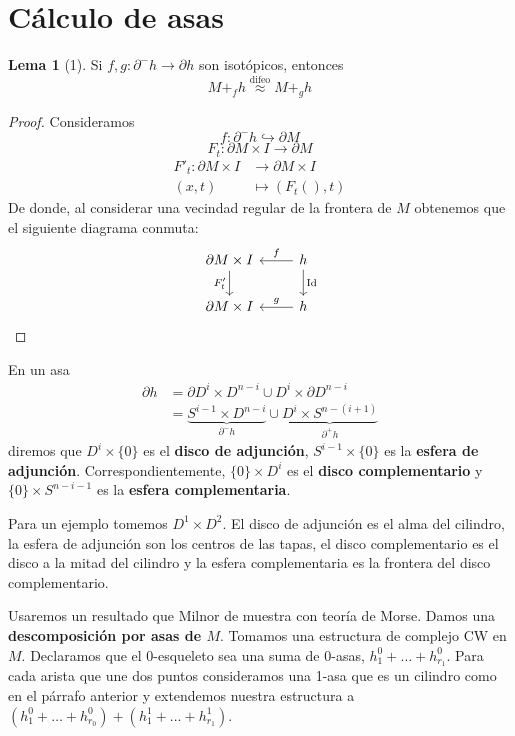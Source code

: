 \documentclass[spanish]{book}
\theoremstyle{definition}
\newtheorem*{lema}{Lema}
\DeclareMathOperator{\Id}{Id}
\begin{document}
\section{Cálculo de asas}
\begin{lema}[1]
	Si $f,g:\partial^-h\to\partial h$ son isotópicos, entonces
	\[M+_fh\overset{\text{difeo}}{\approx}M+_gh\]
\end{lema}
\begin{proof}
	Consideramos
	\[f:\partial^-h\hookrightarrow \partial M\]
	\[F_t:\partial M\times I\to \partial M\]
	\begin{align*}
		F'_t:\partial M\times I&\to \partial M\times I\\
	(x,t)&\mapsto (F_t(),t)
	\end{align*}
	De donde, al considerar una vecindad regular de la frontera de $M$ obtenemos que el siguiente diagrama conmuta:
	\[\begin{tikzcd}
		\partial M\times I\arrow[d,"F'_t",swap]&h\arrow[l,swap,"f"]\arrow[d,"\Id"]\\
		\partial M\times I&h\arrow[l,swap,"g"]
	\end{tikzcd}\]
\end{proof}
En un asa
	\begin{align*}
	\partial h&=\partial D^i\times D^{n-i}\cup D^i\times \partial D^{n-i}\\
	&=\underbrace{S^{i-1}\times D^{n-i}}_{\partial^-h}\cup\underbrace{ D^{i}\times S^{n-(i+1)}}_{\partial^+h}
\end{align*}
diremos que $D^i\times\{0\}$ es el \textbf{disco de adjunción}, $S^{i-1}\times\{0\}$ es la \textbf{esfera de adjunción}. Correspondientemente, $\{0\}\times D^i$ es el \textbf{disco complementario} y $\{0\}\times S^{n-i-1}$ es la \textbf{esfera complementaria}.

Para un ejemplo tomemos $D^1\times D^2$. El disco de adjunción es el alma del cilindro, la esfera de adjunción son los centros de las tapas, el disco complementario es el disco a la mitad del cilindro y la esfera complementaria es la frontera del disco complementario.

Usaremos un resultado que Milnor de muestra con teoría de Morse. Damos una \textbf{descomposición por asas de $M$}. Tomamos una estructura de complejo CW en $M$. Declaramos que el 0-esqueleto sea una suma de 0-asas, $h^0_1+\ldots+h_{r_1}^0$. Para cada arista que une dos puntos consideramos una 1-asa que es un cilindro como en el párrafo anterior y extendemos nuestra estructura a $(h^0_1+\ldots+h_{r_0}^0)+(h^1_1+\ldots +h^1_{r_1})$.
\end{document}
